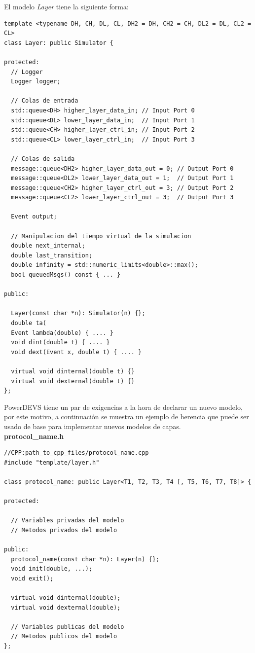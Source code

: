 \documentclass[10pt,a4paper]{article}
\begin{document}
El modelo \textit{Layer} tiene la siguiente forma:
\begin{lstlisting}
template <typename DH, CH, DL, CL, DH2 = DH, CH2 = CH, DL2 = DL, CL2 = CL>
class Layer: public Simulator { 

protected:
  // Logger
  Logger logger;

  // Colas de entrada
  std::queue<DH> higher_layer_data_in; // Input Port 0
  std::queue<DL> lower_layer_data_in;  // Input Port 1
  std::queue<CH> higher_layer_ctrl_in; // Input Port 2 
  std::queue<CL> lower_layer_ctrl_in;  // Input Port 3
  
  // Colas de salida
  message::queue<DH2> higher_layer_data_out = 0; // Output Port 0 
  message::queue<DL2> lower_layer_data_out = 1;  // Output Port 1
  message::queue<CH2> higher_layer_ctrl_out = 3; // Output Port 2
  message::queue<CL2> lower_layer_ctrl_out = 3;  // Output Port 3

  Event output;

  // Manipulacion del tiempo virtual de la simulacion 
  double next_internal;
  double last_transition;
  double infinity = std::numeric_limits<double>::max();
  bool queuedMsgs() const { ... }

public:

  Layer(const char *n): Simulator(n) {};
  double ta(
  Event lambda(double) { .... }
  void dint(double t) { .... }
  void dext(Event x, double t) { .... }
  
  virtual void dinternal(double t) {}
  virtual void dexternal(double t) {}
};
\end{lstlisting}

\newpage

PowerDEVS tiene un par de exigencias a la hora de declarar un nuevo modelo, por este motivo, a continuación se muestra un ejemplo de herencia que puede ser usado de base para implementar nuevos modelos de capas. \\

\textbf{protocol\_name.h}
\begin{lstlisting}
//CPP:path_to_cpp_files/protocol_name.cpp
#include "template/layer.h"

class protocol_name: public Layer<T1, T2, T3, T4 [, T5, T6, T7, T8]> { 

protected:
	
  // Variables privadas del modelo
  // Metodos privados del modelo

public:
  protocol_name(const char *n): Layer(n) {};
  void init(double, ...);
  void exit();

  virtual void dinternal(double);
  virtual void dexternal(double);
  
  // Variables publicas del modelo
  // Metodos publicos del modelo
};
\end{lstlisting}
\end{document}
